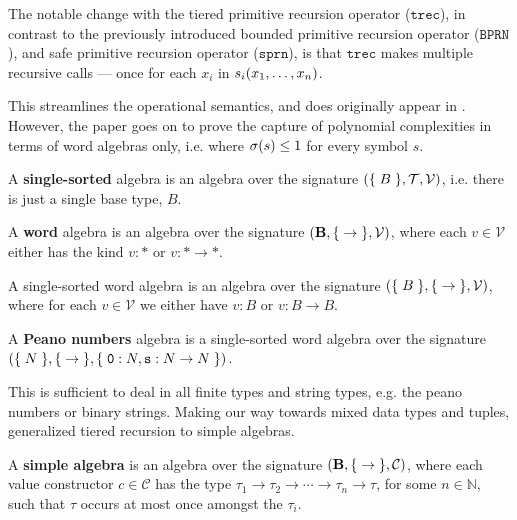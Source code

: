 The notable change with the tiered primitive recursion operator
($\mathtt{trec}$), in contrast to the previously introduced bounded primitive
recursion operator ($\mathtt{BPRN}$), and safe primitive recursion operator
($\mathtt{sprn}$), is that $\mathtt{trec}$ makes multiple recursive calls ---
once for each $x_i$ in $s_i{\mathopen{}\left({x_1,\ldots,x_n}\right)\mathclose{}}$.

This streamlines the operational semantics, and does originally appear in
\cite{leivant-1995}. However, the paper goes on to prove the capture of
polynomial complexities in terms of word algebras only, i.e. where $\sigma{\ensuremath{\mathopen{}\left({s}\right)\mathclose{}}}
\leq 1$ for every symbol $s$.

\begin{definition} A \textbf{single-sorted} algebra is an algebra over the
signature ${\mathopen{}\left({\mathopen{}\left\{\mathrel{}{B}\mathrel{}\right\}\mathclose{}, \mathcal{T}, \mathcal{V}}\right)\mathclose{}}$, i.e. there is just a single
base type, $B$. \end{definition}

\begin{definition} A \textbf{word} algebra is an algebra over the signature
${\mathopen{}\left({\mathbf{B}, \mathopen{}\left\{\mathrel{}{\rightarrow}\mathrel{}\right\}\mathclose{}, \mathcal{V}}\right)\mathclose{}}$, where each $v \in
\mathcal{V}$ either has the kind $v : *$ or $v : *\rightarrow *$.
\end{definition}

\begin{example} A single-sorted word algebra is an algebra over the signature
${\mathopen{}\left({\mathopen{}\left\{\mathrel{}{B}\mathrel{}\right\}\mathclose{},\mathopen{}\left\{\mathrel{}{\rightarrow}\mathrel{}\right\}\mathclose{}, \mathcal{V}}\right)\mathclose{}}$, where for each $v \in
\mathcal{V}$ we either have $v : B$ or $v : B\rightarrow B$. \end{example}

\begin{definition} A \textbf{Peano numbers} algebra is a single-sorted word
algebra over the signature ${\mathopen{}\left({\mathopen{}\left\{\mathrel{}{N}\mathrel{}\right\}\mathclose{}, \mathopen{}\left\{\mathrel{}{\rightarrow}\mathrel{}\right\}\mathclose{},\mathopen{}\left\{\mathrel{}{\mathtt{0} : N,
\mathtt{s} : N \rightarrow N}\mathrel{}\right\}\mathclose{}}\right)\mathclose{}}$. \end{definition}


This is sufficient to deal in all finite types and string types, e.g.  the
peano numbers or binary strings. Making our way towards mixed data types and
tuples, \cite{marion-2003} generalized tiered recursion to simple algebras.
 
\begin{definition} A \textbf{simple algebra} is an algebra over the signature
${\mathopen{}\left({\mathbf{B}, \mathopen{}\left\{\mathrel{}{\rightarrow}\mathrel{}\right\}\mathclose{}, \mathcal{C}}\right)\mathclose{}}$, where each value constructor
$c \in \mathcal{C}$ has the type $\tau_1 \rightarrow \tau_2 \rightarrow \cdots
\rightarrow \tau_n \rightarrow \tau$, for some $n\in \mathbb{N}$, such that
$\tau$ occurs at most once amongst the $\tau_i$.  \end{definition}

